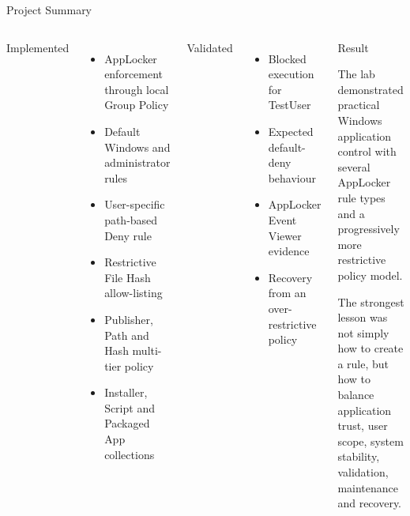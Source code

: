 \documentclass[aspectratio=169,10pt]{beamer}
\newcommand{\boxtext}[4][SoftGrey]{%
	\begingroup
	\setlength{\fboxsep}{7pt}%
	\colorbox{#1}{%
		\parbox{\dimexpr\linewidth-2\fboxsep\relax}{%
\RaggedRight
			{\color{#2}\large #3}
			\par
			\vspace{0.07cm}
			{\small #4}%
		}%
	}%
	\endgroup
}
\newcommand{\sectionlabel}[1]{%
	{\color{PortfolioTeal}\large #1}
}
\newcommand{\bluelabel}[1]{%
	{\color{PortfolioBlue}\large #1}
}
\begin{document}
	\begin{frame}{Project Summary}
		
		\begin{columns}[T,onlytextwidth]
			
			
			\sectionlabel{Implemented}
			
			\begin{itemize}
				\small
				\setlength\itemsep{0.07cm}
				
				\item AppLocker enforcement through local Group Policy
				
				\item Default Windows and administrator rules
				
				\item User-specific path-based Deny rule
				
				\item Restrictive File Hash allow-listing
				
				\item Publisher, Path and Hash multi-tier policy
				
				\item Installer, Script and Packaged App collections
				
			\end{itemize}
			
			\vspace{0.12cm}
			
			\bluelabel{Validated}
			
			\begin{itemize}
				\small
				\setlength\itemsep{0.07cm}
				
				\item Blocked execution for TestUser
				
				\item Expected default-deny behaviour
				
				\item AppLocker Event Viewer evidence
				
				\item Recovery from an over-restrictive policy
				
			\end{itemize}
			
			
			\boxtext[SoftBlue]
			{PortfolioBlue}
			{Result}
			{
				The lab demonstrated practical Windows application
				control with several AppLocker rule types and a progressively
				more restrictive policy model.
				
				\par
				\vspace{0.12cm}
				
				The strongest lesson was not simply how to create a rule,
				but how to balance application trust, user scope,
				system stability, validation, maintenance and recovery.
			}
			
		\end{columns}
		
	\end{frame}
	
\end{document}
